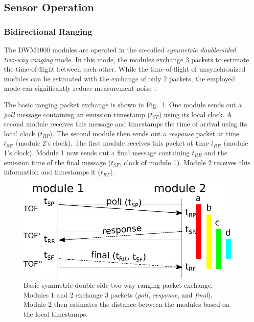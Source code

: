 \subsection{Sensor Operation}
\subsubsection{Bidirectional Ranging}
The DWM1000 modules are operated in the so-called \emph{symmetric double-sided two-way ranging} mode.
In this mode, the modules exchange $3$ packets to estimate the time-of-flight between each other.
While the time-of-flight of unsynchronized modules can be estimated with the exchange of only $2$ packets, the employed mode can significantly reduce measurement noise~\cite{decawave}.

The basic ranging packet exchange is shown in Fig.~\ref{fig:bidirectional_ranging}.
One module sends out a \emph{poll} message containing an emission timestamp ($t_{SP}$) using its local clock.
A second module receives this message and timestamps the time of arrival using its local clock ($t_{RP}$).
The second module then sends out a \emph{response} packet at time $t_{SR}$ (module 2's clock).
The first module receives this packet at time $t_{RR}$  (module 1's clock).
Module 1 now sends out a final message containing $t_{RR}$ and the emission time of the final message ($t_{SF}$, clock of module 1).
Module 2 receives this information and timestamps it ($t_{RF}$). 


\begin{figure}[tpbh]
 \centering
  \includegraphics[width=.6\linewidth]{tex/img/bidirectional_ranging.pdf}
 \caption{Basic symmetric double-side two-way ranging packet exchange. 
 Modules 1 and 2 exchange 3 packets (\emph{poll}, \emph{response}, and \emph{final}). Module 2 then estimates the distance between the modules based on the local timestamps.}
\label{fig:bidirectional_ranging}
 \end{figure}

